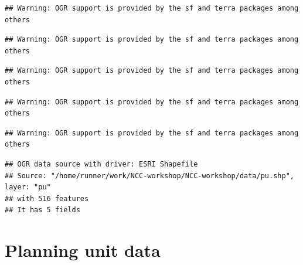 \documentclass[
  12pt,
]{book}
\newenvironment{Shaded}{\begin{snugshade}}{\end{snugshade}}
\newcommand{\CommentTok}[1]{\textcolor[rgb]{0.56,0.35,0.01}{\textit{#1}}}
\newcommand{\FunctionTok}[1]{\textcolor[rgb]{0.00,0.00,0.00}{#1}}
\newcommand{\NormalTok}[1]{#1}
\newcommand{\OtherTok}[1]{\textcolor[rgb]{0.56,0.35,0.01}{#1}}
\newcommand{\SpecialCharTok}[1]{\textcolor[rgb]{0.00,0.00,0.00}{#1}}
\newcommand{\StringTok}[1]{\textcolor[rgb]{0.31,0.60,0.02}{#1}}
\begin{document}
\begin{verbatim}
## Warning: OGR support is provided by the sf and terra packages among others
\end{verbatim}

\begin{verbatim}
## Warning: OGR support is provided by the sf and terra packages among others
\end{verbatim}

\begin{verbatim}
## Warning: OGR support is provided by the sf and terra packages among others
\end{verbatim}

\begin{verbatim}
## Warning: OGR support is provided by the sf and terra packages among others
\end{verbatim}

\begin{verbatim}
## Warning: OGR support is provided by the sf and terra packages among others
\end{verbatim}

\begin{verbatim}
## OGR data source with driver: ESRI Shapefile 
## Source: "/home/runner/work/NCC-workshop/NCC-workshop/data/pu.shp", layer: "pu"
## with 516 features
## It has 5 fields
\end{verbatim}

\begin{Shaded}
\end{Shaded}

\clearpage

\hypertarget{planning-unit-data}{%
\section{Planning unit data}\label{planning-unit-data}}
\end{document}
